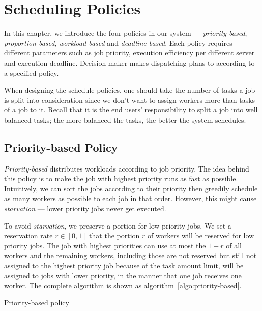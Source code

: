\section{Scheduling Policies}\label{sec:policy}

In this chapter, we introduce the four policies in our system ---
\emph{priority-based}, \emph{proportion-based}, \emph{workload-based}
and \emph{deadline-based}.
Each policy requires different parameters such as job priority,
execution efficiency per different server and execution deadline.
Decision maker makes dispatching plans to according to a specified
policy.

When designing the schedule policies, one should take the number of
tasks a job is split into consideration since we don't want to assign
workers more than tasks of a job to it.
Recall that it is the end users' responsibility to split a job into well
balanced tasks; the more balanced the tasks, the better the system
schedules.


\subsection{Priority-based Policy}

\emph{Priority-based} distributes workloads according to job priority. 
The idea behind this policy is to make the job with highest priority runs as
fast as possible.
Intuitively, we can sort the jobs according to their priority then greedily
schedule as many workers as possible to each job in that order.
However, this might cause \emph{starvation} --- lower priority jobs
never get executed.


To avoid \emph{starvation}, we preserve a portion for low priority jobs.
We set a reservation rate $r \in [0,1]$ that the portion $r$ of workers
will be reserved for low priority jobs.
The job with highest priorities can use at most the $1-r$ of all workers
and the remaining workers, including those are not reserved but still not
assigned to the highest priority job because of the task amount limit,
will be assigned to jobs with lower priority, in the manner that one job
receives one worker.
The complete algorithm is shown as algorithm~\ref{algo:priority-based}.

\begin{algorithm}[]
  
  \caption{Priority-based policy}
  \label{algo:priority-based}
\end{algorithm}


